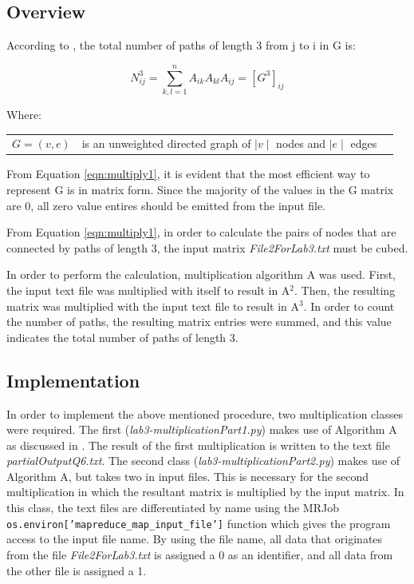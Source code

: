 \documentclass[10pt,twocolumn]{witseiepaper}
\begin{document}
\subsection{Overview}
According to \cite{pathLength3}, the total number of paths of length 3 from j to i in G is:

 \begin{equation}
N_{ij}^{3} = \sum _{k,l = 1}^{n} A_{ik}A_{kl}A_{ij} = [G^{3}]_{ij}
\label{eqn:multiply1}
\end{equation}

Where:
\begin{tabular}{lll}
	$G = (v,e)$           &  is an unweighted directed graph of $\mid v \mid$ nodes and $\mid e \mid$ edges \\
\end{tabular}

From Equation \ref{eqn:multiply1}, it is evident that the most efficient way to represent G is in matrix form. Since the majority of the values in the G matrix are 0, all zero value entires should be emitted from the input file.

From Equation \ref{eqn:multiply1}, in order to calculate the pairs of nodes that are connected by paths of length 3, the input matrix \textit{File2ForLab3.txt} must be cubed.

In order to perform the calculation, multiplication algorithm A was used. First, the input text file was multiplied with itself to result in A$^{2}$. Then, the resulting matrix was multiplied with the input text file to result in A$^{3}$. In order to count the number of paths, the resulting matrix entries were summed, and this value indicates the total number of paths of length 3.

\subsection{Implementation} 
In order to implement the above mentioned procedure, two multiplication classes were required. The first (\textit{lab3-multiplicationPart1.py}) makes use of Algorithm A as discussed in . The result of the first multiplication is written to the text file \textit{partialOutputQ6.txt}. The second class (\textit{lab3-multiplicationPart2.py}) makes use of Algorithm A, but takes two in input files. This is necessary for the second multiplication in which the resultant matrix is multiplied by the input matrix. In this class, the text files are differentiated by name using the MRJob \texttt{os.environ['mapreduce\_map\_input\_file']} function which gives the program access to the input file name. By using the file name, all data that originates from the file \textit{File2ForLab3.txt} is assigned a 0 as an identifier, and all data from the other file is assigned a 1.
\end{document}
